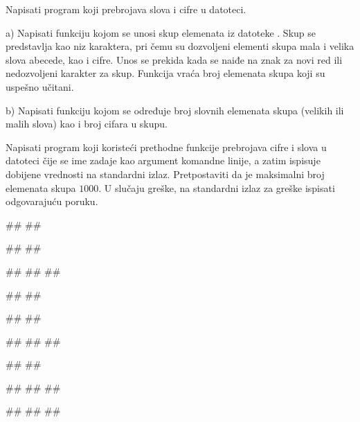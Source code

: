 \begin{Exercise}[label=p3_x4]         
Napisati program koji prebrojava slova i cifre u datoteci.
\begin{description}
\item{a)} Napisati funkciju 
  kojom se unosi skup elemenata iz datoteke . Skup se predstavlja kao
  niz karaktera, pri čemu su dozvoljeni elementi skupa mala i
  velika slova abecede, kao i cifre.  Unos se prekida kada se naiđe
  na znak za novi red ili nedozvoljeni karakter za skup.
  Funkcija vraća broj elemenata skupa koji su uspešno učitani.
\item{b)} Napisati funkciju
   kojom se
  određuje broj slovnih elemenata skupa (velikih ili malih slova)
  kao i broj cifara u skupu.
\end{description}
Napisati program koji koristeći prethodne funkcije prebrojava cifre i slova u datoteci 
čije se ime zadaje kao argument komandne linije, a zatim ispisuje dobijene vrednosti na standardni izlaz.
Pretpostaviti da je maksimalni broj elemenata skupa $1000$.
U slučaju greške, na standardni izlaz za greške ispisati odgovarajuću poruku.

\begin{minitest}
\begin{upotreba}{1}
#\naslovPokretanje#
##

##
##

#\naslovIzlaz#
##
##
\end{upotreba}
\end{minitest}
\begin{minitest}
\begin{upotreba}{2}
#\naslovPokretanje#
##

##
##

#\naslovIzlaz#
##
##
\end{upotreba}
\end{minitest}
\begin{minitest}
\begin{upotreba}{3}
#\naslovPokretanje#
##

##
##
##

#\naslovIzlaz#
##
##
\end{upotreba}
\end{minitest}


\end{Exercise}
